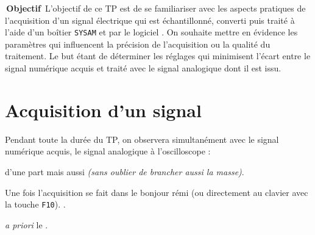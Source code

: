 \documentclass[a4paper,french,bookmarks]{article}
\begin{document}
    \renewcommand{\thesection}{\Roman{section}}
    \renewcommand{\labelenumi}{\thesection.\arabic{enumi}.}
    \renewcommand*{\labelenumii}{\thesection.\arabic{enumi}.\arabic{enumii}.}
    
    
    \colorbox{colexp!20}{\textnormal{\color{colexp}\sffamily\bfseries \,Objectif\,}} L'objectif de ce TP est de se familiariser avec les aspects pratiques de l'acquisition d'un signal électrique qui est échantillonné, converti puis traité à l'aide d'un boîtier \texttt{SYSAM} et par le logiciel . On souhaite mettre en évidence les paramètres qui influencent la précision de l'acquisition ou la qualité du traitement. Le but étant de déterminer les réglages qui minimisent l'écart entre le signal numérique acquis et traité avec le signal analogique dont il est issu.
    
    \section{Acquisition d'un signal}
    
    
    \begin{experience}{}{}
        Pendant toute la durée du TP, on observera simultanément avec le signal numérique acquis, le signal analogique à l'oscilloscope :
        \begin{enumerate}
            \ithand {} d'une part  mais aussi  \emph{(sans oublier de brancher aussi la masse)}.
            
            \ithand Une fois  l'acquisition se fait dans le bonjour rémi   (ou directement au clavier avec la touche \texttt{F10}).  .
            
            \ithand {} \emph{\large\EBGaramond a priori} le .
        \end{enumerate}
    \end{experience}
    
    
    
\end{document}
